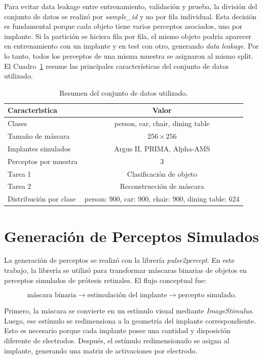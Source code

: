 \documentclass[conference,a4paper]{IEEEtran}
\begin{document}
Para evitar data leakage entre entrenamiento, validación y prueba, la división del conjunto de datos se realizó por \textit{sample\_id} y no por fila individual. Esta decisión es fundamental porque cada objeto tiene varios perceptos asociados, uno por implante. Si la partición se hiciera fila por fila, el mismo objeto podría aparecer en entrenamiento con un implante y en test con otro, generando \textit{data leakage}. Por lo tanto, todos los perceptos de una misma muestra se asignaron al mismo split. El Cuadro~\ref{tab:dataset} resume las principales características del conjunto de datos utilizado.

\begin{table}[H]
\centering
\caption{Resumen del conjunto de datos utilizado.}
\label{tab:dataset}
\begin{tabular}{lc}
\toprule
Caracter\'{\i}stica & Valor \\
\midrule
Clases & person, car, chair, dining table \\
Tama\~no de m\'ascara & $256 \times 256$ \\
Implantes simulados & Argus II, PRIMA, Alpha-AMS \\
Perceptos por muestra & 3 \\
Tarea 1 & Clasificaci\'on de objeto \\
Tarea 2 & Reconstrucci\'on de m\'ascara \\
Distribuci\'on por clase & person: 900, car: 900, chair: 900, dining table: 624 \\
\bottomrule
\end{tabular}
\end{table}

\section{Generación de Perceptos Simulados}

La generación de perceptos se realizó con la librería \textit{pulse2percept}. En este trabajo, la librería se utilizó para transformar máscaras binarias de objetos en perceptos simulados de prótesis retinales. El flujo conceptual fue:

\begin{equation}
\text{máscara binaria} \rightarrow \text{estimulación del implante} \rightarrow \text{percepto simulado}.
\end{equation}

Primero, la máscara se convierte en un estímulo visual mediante \textit{ImageStimulus}. Luego, ese estímulo se redimensiona a la geometría del implante correspondiente. Esto es necesario porque cada implante posee una cantidad y disposición diferente de electrodos. Después, el estímulo redimensionado se asigna al implante, generando una matriz de activaciones por electrodo.
\end{document}
